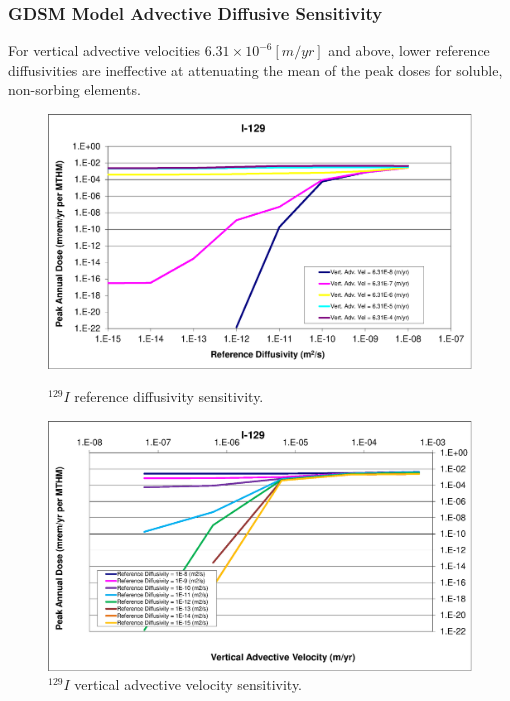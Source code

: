 
\begin{frame}[ctb!]
\frametitle{GDSM Model Advective Diffusive Sensitivity}
For vertical advective velocities 
$6.31\times10^{-6}[m/yr]$ and above, lower reference diffusivities are 
ineffective at attenuating the mean of the peak doses for soluble, non-sorbing 
elements. 

\begin{figure}[htp!]
\begin{minipage}[b]{0.45\linewidth}
\centering
\includegraphics[width=\linewidth]{./nuclide_demonstration/AdvVelDiff/I-129.eps}
\caption{$^{129}I$ reference diffusivity sensitivity.}
\label{fig:VAdvVelI129}

\end{minipage}
\hspace{0.05\linewidth}
\begin{minipage}[b]{0.45\linewidth}

\includegraphics[width=\linewidth]{./nuclide_demonstration/AdvVelDiff/I-129-VAdvVel.eps}
\caption{$^{129}I$ vertical advective velocity sensitivity.}
\label{fig:VAdvVelI129VAdvVel}

\end{minipage}
\end{figure}
\end{frame}

